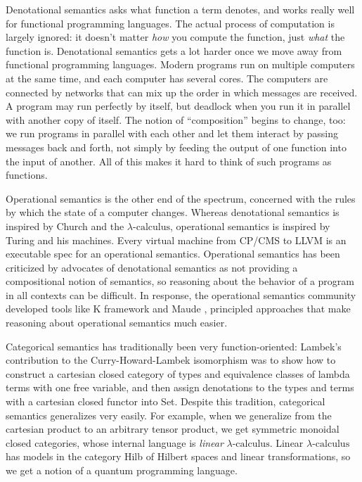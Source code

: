 \documentclass[submission,copyright,creativecommons]{eptcs}
\newcommand{\lac}{$\lambda\mbox{-calculus}$\xspace}
\begin{document}
Denotational semantics asks what function a term denotes, and works really well for functional programming languages.  The actual process of computation is largely ignored: it doesn't matter {\em how} you compute the function, just {\em what} the function is.  Denotational semantics gets a lot harder once we move away from functional programming languages.  Modern programs run on multiple computers at the same time, and each computer has several cores. The computers are connected by networks that can mix up the order in which messages are received.  A program may run perfectly by itself, but deadlock when you run it in parallel with another copy of itself.  The notion of ``composition'' begins to change, too: we run programs in parallel with each other and let them interact by passing messages back and forth, not simply by feeding the output of one function into the input of another.  All of this makes it hard to think of such programs as functions.

Operational semantics is the other end of the spectrum, concerned with the rules by which the state of a computer changes.  Whereas denotational semantics is inspired by Church and the \lac, operational semantics is inspired by Turing and his machines.  Every virtual machine from CP/CMS to LLVM is an executable spec for an operational semantics.  Operational semantics has been criticized by advocates of denotational semantics as not providing a compositional notion of semantics, so reasoning about the behavior of a program in all contexts can be difficult.  In response, the operational semantics community developed tools like K framework \cite{kframework} and Maude \cite{Maude}, principled approaches that make reasoning about operational semantics much easier.

Categorical semantics has traditionally been very function-oriented: Lambek's contribution \cite{Lambek} to the Curry-Howard-Lambek isomorphism was to show how to construct a cartesian closed category of types and equivalence classes of lambda terms with one free variable, and then assign denotations to the types and terms with a cartesian closed functor into Set.  Despite this tradition, categorical semantics generalizes very easily.  For example, when we generalize from the cartesian product to an arbitrary tensor product, we get symmetric monoidal closed categories, whose internal language is {\em linear} \lac.  Linear \lac has models in the category Hilb of Hilbert spaces and linear transformations, so we get a notion of a quantum programming language.
\end{document}
